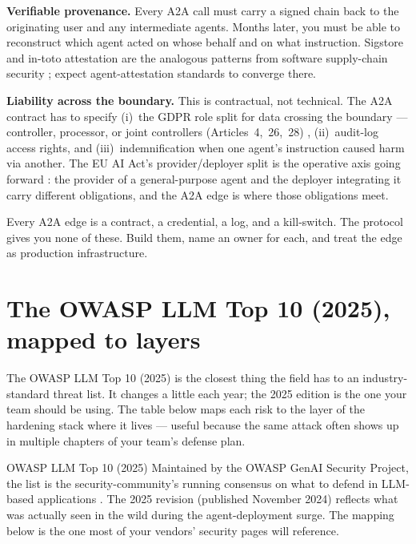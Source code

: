 \begin{TNnew}
\textbf{Verifiable provenance.} Every A2A call must carry a signed chain back to the originating user and any intermediate agents. Months later, you must be able to reconstruct which agent acted on whose behalf and on what instruction. Sigstore and in-toto attestation are the analogous patterns from software supply-chain security \citep{intoto-spec,sigstore-2022}; expect agent-attestation standards to converge there.

\textbf{Liability across the boundary.} This is contractual, not technical. The A2A contract has to specify (i)~the GDPR role split for data crossing the boundary --- controller, processor, or joint controllers (Articles~4,~26,~28) \citep{gdpr-2016}, (ii)~audit-log access rights, and (iii)~indemnification when one agent's instruction caused harm via another. The EU AI Act's provider/deployer split is the operative axis going forward \citep{eu-ai-act-2024}: the provider of a general-purpose agent and the deployer integrating it carry different obligations, and the A2A edge is where those obligations meet.

Every A2A edge is a contract, a credential, a log, and a kill-switch. The protocol gives you none of these. Build them, name an owner for each, and treat the edge as production infrastructure.
\end{TNnew}

\section{The OWASP LLM Top 10 (2025), mapped to layers}

The OWASP LLM Top 10 (2025) is the closest thing the field has to an industry-standard threat list. It changes a little each year; the 2025 edition is the one your team should be using. The table below maps each risk to the layer of the hardening stack where it lives --- useful because the same attack often shows up in multiple chapters of your team's defense plan.

\begin{TNinpractice}{OWASP LLM Top 10 (2025)}
Maintained by the OWASP GenAI Security Project, the list is the security-community's running consensus on what to defend in LLM-based applications \citep{owaspLLM2025}. The 2025 revision (published November 2024) reflects what was actually seen in the wild during the agent-deployment surge. The mapping below is the one most of your vendors' security pages will reference.
\end{TNinpractice}

